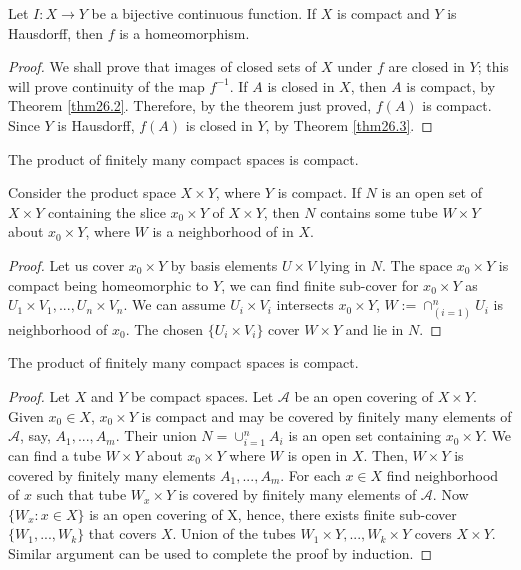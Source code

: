 \documentclass[a4paper,english,12pt]{article}
\begin{document}
\begin{thm}
	Let $I : X \rightarrow Y$ be a bijective continuous function. If $X$ is compact and $Y$ is Hausdorff, then $f$ is a homeomorphism.
\end{thm} 
\begin{proof}
	 We shall prove that images of closed sets of $X$ under $f$ are closed in $Y$; this will prove continuity of the map $f^{-1}$. If $A$ is closed in $X$, then $A$ is compact, by Theorem \ref{thm26.2}. Therefore, by the theorem just proved, $f(A)$ is compact. Since $Y$ is Hausdorff, $f(A)$ is closed in $Y$, by Theorem \ref{thm26.3}.
\end{proof}

\begin{thm}
	The product of finitely many compact spaces is compact.
\end{thm}

\begin{lem}
	Consider the product space $X \times Y$, where $Y$ is compact. If $N$ is an open set of $X \times Y$ containing the slice $x_0 \times Y$ of $X \times Y$, then $N$ contains some tube $W \times Y$ about $x_0 \times Y$, where $W$ is a neighborhood of in $X$.
\end{lem}
\begin{proof}
	Let us cover $x_0 \times Y$ by basis elements $U \times V$ lying in $N$. The space $x_0 \times Y$ is compact being homeomorphic to $Y$, we can find finite sub-cover for $x_0 \times Y$ as $U_1 \times V_1,...,U_n \times V_n$. We can assume $U_i \times V_i$ intersects $x_0 \times Y$, $W:=\cap_{(i=1)}^n U_i$ is neighborhood of $x_0$. The chosen $\{U_i \times V_i\}$ cover $W \times Y$ and lie in $N$.
\end{proof}

\begin{thm}
	The product of finitely many compact spaces is compact.
\end{thm}

\begin{proof}
	Let $X$ and $Y$ be compact spaces. Let $\mathcal{A}$ be an open covering of $X \times Y$. Given $x_0 \in X$, $x_0 \times Y$ is compact and may be covered by finitely many elements of $\mathcal{A}$, say, $A_1,..., A_m$. Their union $N=\cup_{i=1}^n A_i$ is an open set containing $x_0 \times Y$. We can find a tube $W \times Y$ about $x_0 \times Y$ where $W$ is open in $X$. Then, $W \times Y$ is covered by finitely many elements $A_1,...,A_m$.
	For each $x \in X$ find neighborhood of $x$ such that tube $W_x \times Y$ is covered by finitely many elements of $\mathcal{A}$. Now $\{W_x : x \in X\}$ is an open covering of X, hence, there exists finite sub-cover $\{W_1,..., W_k\}$ that covers $X$. Union of the tubes $W_1 \times Y,..., W_k \times Y$ covers $X \times Y$.
	Similar argument can be used to complete the proof by induction.
\end{proof}
\end{document}
